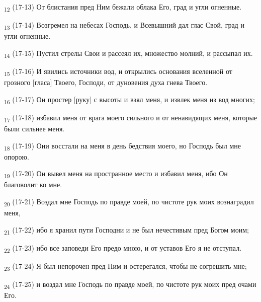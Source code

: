 \begin{tcolorbox}
\textsubscript{12} (17-13) От блистания пред Ним бежали облака Его, град и угли огненные.
\end{tcolorbox}
\begin{tcolorbox}
\textsubscript{13} (17-14) Возгремел на небесах Господь, и Всевышний дал глас Свой, град и угли огненные.
\end{tcolorbox}
\begin{tcolorbox}
\textsubscript{14} (17-15) Пустил стрелы Свои и рассеял их, множество молний, и рассыпал их.
\end{tcolorbox}
\begin{tcolorbox}
\textsubscript{15} (17-16) И явились источники вод, и открылись основания вселенной от грозного [гласа] Твоего, Господи, от дуновения духа гнева Твоего.
\end{tcolorbox}
\begin{tcolorbox}
\textsubscript{16} (17-17) Он простер [руку] с высоты и взял меня, и извлек меня из вод многих;
\end{tcolorbox}
\begin{tcolorbox}
\textsubscript{17} (17-18) избавил меня от врага моего сильного и от ненавидящих меня, которые были сильнее меня.
\end{tcolorbox}
\begin{tcolorbox}
\textsubscript{18} (17-19) Они восстали на меня в день бедствия моего, но Господь был мне опорою.
\end{tcolorbox}
\begin{tcolorbox}
\textsubscript{19} (17-20) Он вывел меня на пространное место и избавил меня, ибо Он благоволит ко мне.
\end{tcolorbox}
\begin{tcolorbox}
\textsubscript{20} (17-21) Воздал мне Господь по правде моей, по чистоте рук моих вознаградил меня,
\end{tcolorbox}
\begin{tcolorbox}
\textsubscript{21} (17-22) ибо я хранил пути Господни и не был нечестивым пред Богом моим;
\end{tcolorbox}
\begin{tcolorbox}
\textsubscript{22} (17-23) ибо все заповеди Его предо мною, и от уставов Его я не отступал.
\end{tcolorbox}
\begin{tcolorbox}
\textsubscript{23} (17-24) Я был непорочен пред Ним и остерегался, чтобы не согрешить мне;
\end{tcolorbox}
\begin{tcolorbox}
\textsubscript{24} (17-25) и воздал мне Господь по правде моей, по чистоте рук моих пред очами Его.
\end{tcolorbox}
